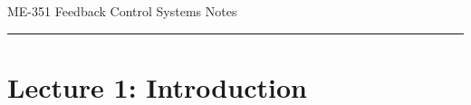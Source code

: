 ﻿\documentclass[12pt]{article}
\begin{document}
\begin{center}
{\LARGE ME-351 Feedback Control Systems Notes\par}
\end{center}
\hrule
\vspace{1.5em}

\section*{Lecture 1: Introduction}
\end{document}
